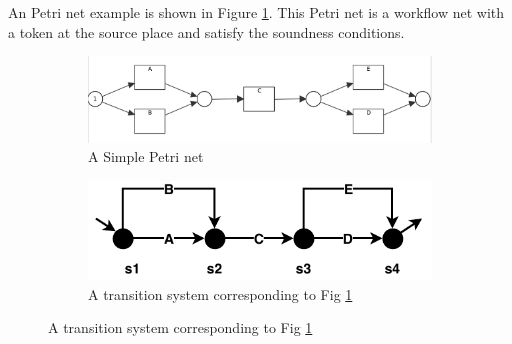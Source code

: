 An Petri net example is shown in Figure \ref{fig:pn-seq-2}. This Petri net is a workflow net with a token at the source place and satisfy the soundness conditions.  
\begin{figure}[!h]
	\centering
	\begin{subfigure}[b]{0.45\textwidth}
		\centering
		\includegraphics[width=\linewidth]{figures/preliminary/PN06_Seq_2_xor_notnested.png}
		\caption{A Simple Petri net}
		\label{fig:pn-seq-2}
	\end{subfigure}%
	\quad
	\begin{subfigure}[b]{0.45\textwidth}
		\centering
		\includegraphics[width=\linewidth]{figures/preliminary/transition-system.pdf}
		\caption{A transition system corresponding to Fig \ref{fig:pn-seq-2}}
		\label{fig:ts-model}
	\end{subfigure}%
    \label{fig:pn-ts}
\end{figure}
